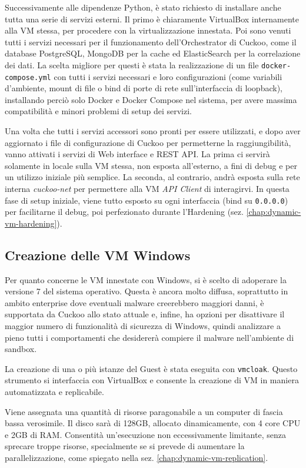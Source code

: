 Successivamente alle dipendenze Python, è stato richiesto di installare anche tutta una serie di servizi esterni.
Il primo è chiaramente VirtualBox internamente alla VM stessa, per procedere con la virtualizzazione innestata.
Poi sono venuti tutti i servizi necessari per il funzionamento dell'Orchestrator di Cuckoo, come il database PostgreSQL, MongoDB per la cache ed ElasticSearch per la correlazione dei dati. La scelta migliore per questi è stata la realizzazione di un file \texttt{docker-compose.yml} con tutti i servizi necessari e loro configurazioni (come variabili d'ambiente, mount di file o bind di porte di rete sull'interfaccia di loopback), installando perciò solo Docker e Docker Compose nel sistema, per avere massima compatibilità e minori problemi di setup dei servizi.

Una volta che tutti i servizi accessori sono pronti per essere utilizzati, e dopo aver aggiornato i file di configurazione di Cuckoo per permetterne la raggiungibilità, vanno attivati i servizi di Web interface e REST API.
La prima ci servirà solamente in locale sulla VM stessa, non esposta all'esterno, a fini di debug e per un utilizzo iniziale più semplice. La seconda, al contrario, andrà esposta sulla rete interna \emph{cuckoo-net} per permettere alla VM \emph{API Client} di interagirvi. In questa fase di setup iniziale, viene tutto esposto su ogni interfaccia (bind su \texttt{0.0.0.0}) per facilitarne il debug, poi perfezionato durante l'Hardening (sez. \ref{chap:dynamic-vm-hardening}).

\subsection{Creazione delle VM Windows}
Per quanto concerne le VM innestate con Windows, si è scelto di adoperare la versione 7 del sistema operativo. Questa è ancora molto diffusa, soprattutto in ambito enterprise dove eventuali malware creerebbero maggiori danni, è supportata da Cuckoo allo stato attuale e, infine, ha opzioni per disattivare il maggior numero di funzionalità di sicurezza di Windows, quindi analizzare a pieno tutti i comportamenti che desidererà compiere il malware nell'ambiente di sandbox.

La creazione di una o più istanze del Guest è stata eseguita con \texttt{vmcloak}.
Questo strumento si interfaccia con VirtualBox e consente la creazione di VM in maniera automatizzata e replicabile.

Viene assegnata una quantità di risorse paragonabile a un computer di fascia bassa verosimile. Il disco sarà di 128GB, allocato dinamicamente, con 4 core CPU e 2GB di RAM. Consentità un'esecuzione non eccessivamente limitante, senza sprecare troppe risorse, specialmente se si prevede di aumentare la parallelizzazione, come spiegato nella sez. \ref{chap:dynamic-vm-replication}.

